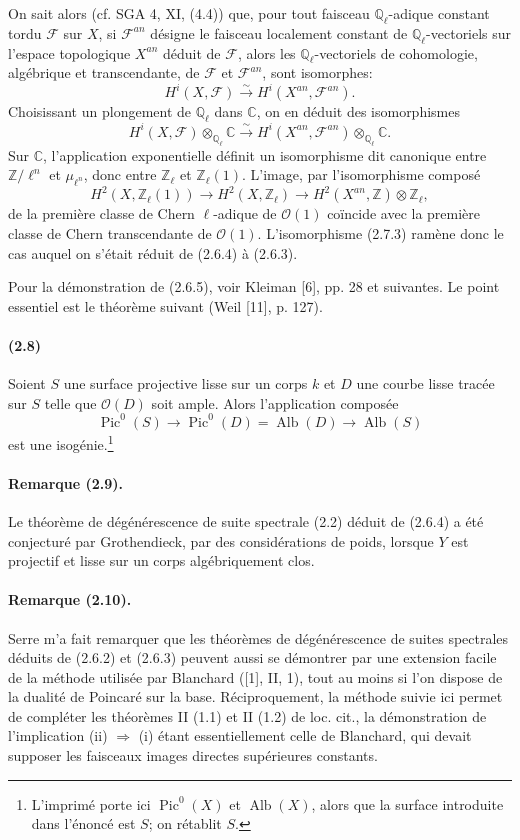 \documentclass[10pt]{article}
\newcommand{\Z}{\mathbb Z}
\newcommand{\iso}{\xrightarrow{\sim}}
\newcommand{\og}{\guillemotleft}
\newcommand{\fg}{\guillemotright}
\providecommand{\C}{\mathbb C}
\providecommand{\Ql}{\mathbb Q_\ell}
\providecommand{\Zl}{\mathbb Z_\ell}
\providecommand{\Alb}{\operatorname{Alb}}
\providecommand{\Pic}{\operatorname{Pic}}
\providecommand{\og}{\guillemotleft}
\providecommand{\fg}{\guillemotright}
\begin{document}
On sait alors (cf. SGA 4, XI, (4.4)) que, pour tout faisceau $\Ql$-adique constant tordu $\mathcal F$ sur $X$, si $\mathcal F^{an}$ désigne le faisceau localement constant de $\Ql$-vectoriels sur l'espace topologique $X^{an}$ déduit de $\mathcal F$, alors les $\Ql$-vectoriels de cohomologie, algébrique et transcendante, de $\mathcal F$ et $\mathcal F^{an}$, sont isomorphes:
\[
\tag{2.7.2}
H^i(X,\mathcal F)\iso H^i(X^{an},\mathcal F^{an}).
\]
Choisissant un plongement de $\Ql$ dans $\C$, on en déduit des isomorphismes
\[
\tag{2.7.3}
H^i(X,\mathcal F)\otimes_{\Ql}\C\iso
H^i(X^{an},\mathcal F^{an})\otimes_{\Ql}\C.
\]
Sur $\C$, l'application exponentielle définit un isomorphisme dit canonique entre $\Z/\ell^n$ et $\mu_{\ell^n}$, donc entre $\Zl$ et $\Zl(1)$. L'image, par l'isomorphisme composé
\[
H^2(X,\Zl(1))\longrightarrow H^2(X,\Zl)\longrightarrow H^2(X^{an},\Z)\otimes\Zl,
\]
de la première classe de Chern $\ell$-adique de $\mathcal O(1)$ coïncide avec la première classe de Chern transcendante de $\mathcal O(1)$. L'isomorphisme (2.7.3) ramène donc le cas auquel on s'était réduit de (2.6.4) à (2.6.3).

Pour la démonstration de (2.6.5), voir Kleiman [6], pp. 28 et suivantes. Le point essentiel est le théorème suivant (Weil [11], p. 127).

\paragraph{(2.8)} Soient $S$ une surface projective lisse sur un corps $k$ et $D$ une courbe lisse tracée sur $S$ telle que $\mathcal O(D)$ soit ample. Alors l'application composée
\[
\Pic^0(S)\longrightarrow\Pic^0(D)=\Alb(D)\longrightarrow\Alb(S)
\]
est une isogénie.\footnote{L'imprimé porte ici $\Pic^0(X)$ et $\Alb(X)$, alors que la surface introduite dans l'énoncé est $S$; on rétablit $S$.}

\paragraph{Remarque (2.9).} Le théorème de dégénérescence de suite spectrale (2.2) déduit de (2.6.4) a été conjecturé par Grothendieck, par des considérations de \og poids\fg, lorsque $Y$ est projectif et lisse sur un corps algébriquement clos.

\paragraph{Remarque (2.10).} Serre m'a fait remarquer que les théorèmes de dégénérescence de suites spectrales déduits de (2.6.2) et (2.6.3) peuvent aussi se démontrer par une extension facile de la méthode utilisée par Blanchard ([1], II, 1), tout au moins si l'on dispose de la dualité de Poincaré sur la base. Réciproquement, la méthode suivie ici permet de compléter les théorèmes II (1.1) et II (1.2) de loc. cit., la démonstration de l'implication (ii) $\Rightarrow$ (i) étant essentiellement celle de Blanchard, qui devait supposer les faisceaux images directes supérieures constants.
\end{document}
